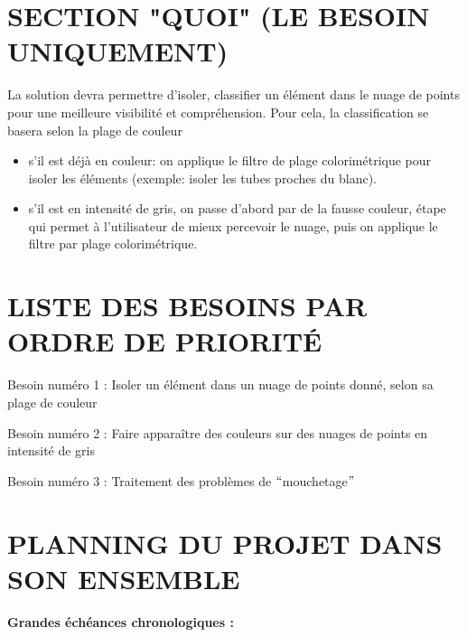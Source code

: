 \documentclass[12pt,titlepage]{report}
\begin{document}
\section{SECTION "QUOI"  (LE BESOIN UNIQUEMENT)}
La solution devra permettre d’isoler, classifier un élément dans le nuage de points pour une meilleure visibilité et compréhension. Pour cela, la classification se basera selon la plage de couleur
\begin{itemize}
	 

	\item  s'il est déjà en couleur: on applique le filtre de plage colorimétrique pour isoler les éléments (exemple: isoler les tubes proches du blanc).\par

	\item  s'il est en intensité de gris, on passe d'abord par de la fausse couleur, étape qui permet à l'utilisateur de mieux percevoir le nuage, puis on applique le filtre par plage colorimétrique.\par


\end{itemize}\par

\section{LISTE DES BESOINS PAR ORDRE DE PRIORITÉ}

Besoin numéro 1 : Isoler un élément dans un nuage de points donné, selon sa plage de couleur\par

Besoin numéro 2 : Faire apparaître des couleurs sur des nuages de points en intensité de gris\par

Besoin numéro 3 : Traitement des problèmes de $``$mouchetage$"$ \par

\section{PLANNING DU PROJET DANS SON ENSEMBLE}

\begin{justify}
\textbf{Grandes échéances chronologiques :}
\end{justify}\par
\end{document}
